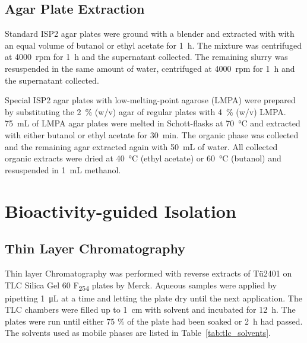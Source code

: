 \subsection{Agar Plate Extraction} %
\label{sub:agar_plate_extraction}

Standard ISP2 agar plates were ground with a blender and extracted with with an equal volume of butanol or ethyl acetate for \SI{1}{\hour}.
The mixture was centrifuged at 4000~rpm for \SI{1}{\hour} and the supernatant collected.
The remaining slurry was resuspended in the same amount of water, centrifuged at 4000~rpm for \SI{1}{\hour} and the supernatant collected.

Special ISP2 agar plates with low-melting-point agarose (LMPA) were prepared by substituting the 2~\% (w/v) agar of regular plates with 4~\% (w/v) LMPA.
\SI{75}{\milli\liter} of LMPA agar plates were melted in Schott-flasks at \SI{70}{\celsius} and extracted with either butanol or ethyl acetate for \SI{30}{\minute}.
The organic phase was collected and the remaining agar extracted again with \SI{50}{\milli\liter} of water.
All collected organic extracts were dried at \SI{40}{\celsius} (ethyl acetate) or \SI{60}{\celsius} (butanol) and resuspended in \SI{1}{\milli\liter} methanol.



\section{Bioactivity-guided Isolation} %
\label{sec:bioactivity_guided_isolation}

\subsection{Thin Layer Chromatography} %
\label{sub:thin_layer_chromatography}
Thin layer Chromatography was performed with reverse extracts of T\"u2401 on TLC Silica Gel 60 F\textsubscript{254} plates by Merck.
Aqueous samples were applied by pipetting \SI{1}{\micro\liter} at a time and letting the plate dry until the next application. The TLC chambers were filled up to \SI{1}{\centi\meter} with solvent and incubated for \SI{12}{\hour}.
The plates were run until either 75 \% of the plate had been soaked or \SI{2}{\hour} had passed.
The solvents used as mobile phases are listed in Table~\ref{tab:tlc_solvents}.

